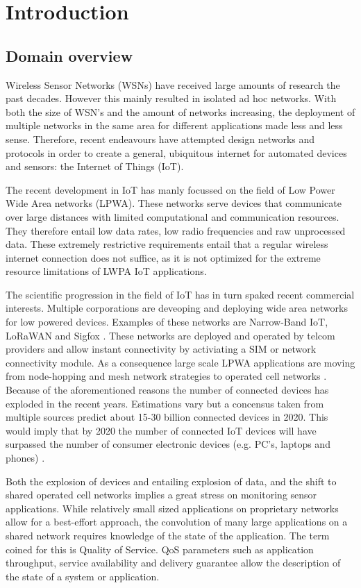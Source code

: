 \chapter{Introduction}
\section{Domain overview} 
Wireless Sensor Networks (WSNs) have received large amounts of research the past decades. However this mainly resulted in isolated ad hoc networks. With both the size of WSN's and the amount of networks increasing, the deployment of multiple networks in the same area for different applications made less and less sense. Therefore, recent endeavours have attempted design networks and protocols in order to create a general, ubiquitous internet for automated devices and sensors: the Internet of Things (IoT).

The recent development in IoT has manly focussed on the field of Low Power Wide Area networks (LPWA). These networks serve devices that communicate over large distances with limited computational and communication resources. They therefore entail low data rates, low radio frequencies and raw unprocessed data. These extremely restrictive requirements entail that a regular wireless internet connection does not suffice, as it is not optimized for the extreme resource limitations of LWPA IoT applications.

The scientific progression in the field of IoT has in turn spaked recent commercial interests. Multiple corporations are deveoping and deploying wide area networks for low powered devices. Examples of these networks are Narrow-Band IoT\cite{web:nbiot}, LoRaWAN \cite{web:lora} and Sigfox \cite{web:sigfox}. These networks are deployed and operated by telcom providers and allow instant connectivity by activiating a SIM or network connectivity module. As a consequence large scale LPWA applications are moving from node-hopping and mesh network strategies to operated cell networks \cite{needs source}. Because of the aforementioned reasons the number of connected devices has exploded in the recent years. Estimations vary but a concensus taken from multiple sources predict about 15-30 billion connected devices in 2020. This would imply that by 2020 the number of connected IoT devices will have surpassed the number of consumer electronic devices (e.g. PC's, laptops and phones) \cite{ericson}. 

Both the explosion of devices and entailing explosion of data, and the shift to shared operated cell networks implies a great stress on monitoring sensor applications. While relatively small sized applications on proprietary networks allow for a best-effort approach, the convolution of many large applications on a shared network requires knowledge of the state of the application. The term coined for this is Quality of Service. QoS parameters such as application throughput, service availability and delivery guarantee allow the description of the state of a system or application.

